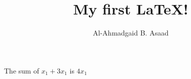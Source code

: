 \documentclass[12pt]{article}
\title{My first \LaTeX!}
\author{Al-Ahmadgaid B. Asaad}
\begin{document}
\maketitle
The sum of $x_1 + 3x_1$ is $4x_1$
\end{document}
